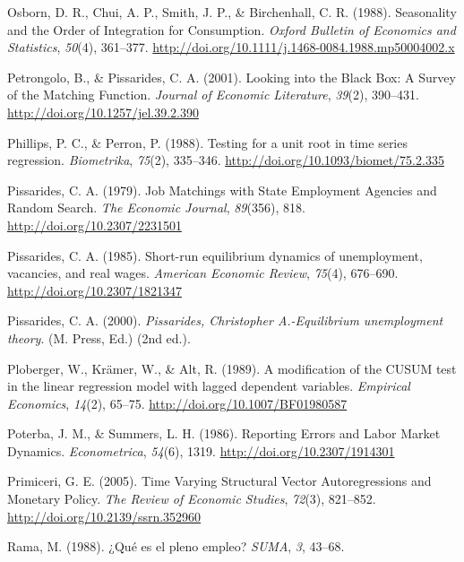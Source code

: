 \documentclass[12pt,oneside]{reedthesis}
\begin{document}
\leavevmode\hypertarget{ref-Osborn1988}{}%
Osborn, D. R., Chui, A. P., Smith, J. P., \& Birchenhall, C. R. (1988). Seasonality and the Order of Integration for Consumption. \emph{Oxford Bulletin of Economics and Statistics}, \emph{50}(4), 361--377. \url{http://doi.org/10.1111/j.1468-0084.1988.mp50004002.x}

\leavevmode\hypertarget{ref-Petrongolo2001}{}%
Petrongolo, B., \& Pissarides, C. A. (2001). Looking into the Black Box: A Survey of the Matching Function. \emph{Journal of Economic Literature}, \emph{39}(2), 390--431. \url{http://doi.org/10.1257/jel.39.2.390}

\leavevmode\hypertarget{ref-PhillipsPerron1988}{}%
Phillips, P. C., \& Perron, P. (1988). Testing for a unit root in time series regression. \emph{Biometrika}, \emph{75}(2), 335--346. \url{http://doi.org/10.1093/biomet/75.2.335}

\leavevmode\hypertarget{ref-Pissarides1979}{}%
Pissarides, C. A. (1979). Job Matchings with State Employment Agencies and Random Search. \emph{The Economic Journal}, \emph{89}(356), 818. \url{http://doi.org/10.2307/2231501}

\leavevmode\hypertarget{ref-Pissarides1985}{}%
Pissarides, C. A. (1985). Short-run equilibrium dynamics of unemployment, vacancies, and real wages. \emph{American Economic Review}, \emph{75}(4), 676--690. \url{http://doi.org/10.2307/1821347}

\leavevmode\hypertarget{ref-Pissarides2000}{}%
Pissarides, C. A. (2000). \emph{Pissarides, Christopher A.-Equilibrium unemployment theory}. (M. Press, Ed.) (2nd ed.).

\leavevmode\hypertarget{ref-Ploberger1989}{}%
Ploberger, W., Krämer, W., \& Alt, R. (1989). A modification of the CUSUM test in the linear regression model with lagged dependent variables. \emph{Empirical Economics}, \emph{14}(2), 65--75. \url{http://doi.org/10.1007/BF01980587}

\leavevmode\hypertarget{ref-Poterba1986}{}%
Poterba, J. M., \& Summers, L. H. (1986). Reporting Errors and Labor Market Dynamics. \emph{Econometrica}, \emph{54}(6), 1319. \url{http://doi.org/10.2307/1914301}

\leavevmode\hypertarget{ref-Primiceri2005}{}%
Primiceri, G. E. (2005). Time Varying Structural Vector Autoregressions and Monetary Policy. \emph{The Review of Economic Studies}, \emph{72}(3), 821--852. \url{http://doi.org/10.2139/ssrn.352960}

\leavevmode\hypertarget{ref-Rama1988}{}%
Rama, M. (1988). ¿Qué es el pleno empleo? \emph{SUMA}, \emph{3}, 43--68.
\end{document}
